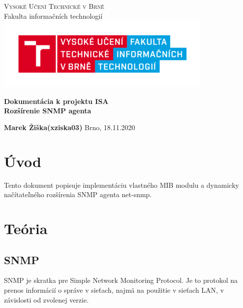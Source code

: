 \documentclass{article}
\begin{document}

	\begin{titlepage}
		\begin{center}
			\textsc{\Huge Vysoké Učení Technické v Brně} \\[0.7cm]
			{\Huge Fakulta informačních technologií}
			\center\includegraphics[width=0.7\linewidth]{./logo.png}

			\vspace{5cm}

			\textbf{{\Huge Dokumentácia k projektu ISA}}\\[0.4cm]
			\textbf{{\LARGE Rozšírenie SNMP agenta}}\\[0.4cm]
			
		\end{center}
		\vfill

		\begin{flushleft}
			\begin{Large}
				\textbf{Marek Žiška}\hspace{10px}\textbf{(xziska03)}
			\hfill
			Brno, 18.11.2020
			\end{Large}
		\end{flushleft}

	\end{titlepage}


	\tableofcontents
	\newpage


	\section{Úvod}
	\large{Tento dokument popisuje implementáciu vlastného MIB modulu a dynamicky načítateľného rozšírenia SNMP agenta net-snmp.}
	\vspace{1cm}
	\section{Teória}
	\subsection{SNMP}
	SNMP je skratka pre Simple Network Monitoring Protocol. Je to protokol na prenos informácií o správe v sieťach, najmä na použitie v sieťach LAN, v závislosti od zvolenej verzie.
	
\end{document}
